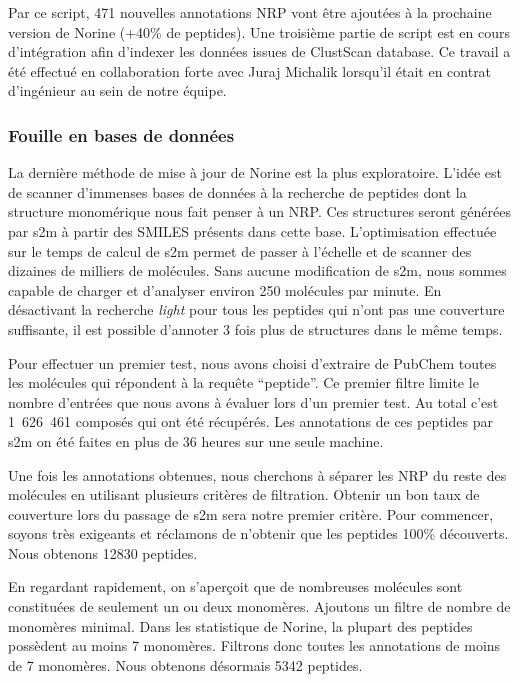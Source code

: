 Par ce script, 471 nouvelles annotations NRP vont être ajoutées à la prochaine version de Norine (+40\% de peptides).
Une troisième partie de script est en cours d'intégration afin d'indexer les données issues de ClustScan database.
Ce travail a été effectué en collaboration forte avec Juraj Michalik lorsqu'il était en contrat d'ingénieur au sein de notre équipe.



\subsubsection{Fouille en bases de données}

La dernière méthode de mise à jour de Norine est la plus exploratoire.
L'idée est de scanner d'immenses bases de données à la recherche de peptides dont la structure monomérique nous fait penser à un NRP.
Ces structures seront générées par s2m à partir des SMILES présents dans cette base.
L'optimisation effectuée sur le temps de calcul de s2m permet de passer à l'échelle et de scanner des dizaines de milliers de molécules.
Sans aucune modification de s2m, nous sommes capable de charger et d'analyser environ 250 molécules par minute.
En désactivant la recherche \textit{light} pour tous les peptides qui n'ont pas une couverture suffisante, il est possible d'annoter 3 fois plus de structures dans le même temps.

Pour effectuer un premier test, nous avons choisi d'extraire de PubChem toutes les molécules qui répondent à la requête ``peptide''.
Ce premier filtre limite le nombre d'entrées que nous avons à évaluer lors d'un premier test.
Au total c'est 1~626~461 composés qui ont été récupérés.
Les annotations de ces peptides par s2m on été faites en plus de 36 heures sur une seule machine.

Une fois les annotations obtenues, nous cherchons à séparer les NRP du reste des molécules en utilisant plusieurs critères de filtration.
Obtenir un bon taux de couverture lors du passage de s2m sera notre premier critère.
Pour commencer, soyons très exigeants et réclamons de n'obtenir que les peptides 100\% découverts.
Nous obtenons 12830 peptides.

En regardant rapidement, on s'aperçoit que de nombreuses molécules sont constituées de seulement un ou deux monomères.
Ajoutons un filtre de nombre de monomères minimal.
Dans les statistique de Norine, la plupart des peptides possèdent au moins 7 monomères.
Filtrons donc toutes les annotations de moins de 7 monomères.
Nous obtenons désormais 5342 peptides.

